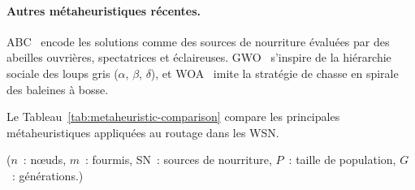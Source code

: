 \paragraph{Autres métaheuristiques récentes.}
ABC~\cite{karaboga2005abc} encode les solutions comme des sources de nourriture évaluées par des abeilles ouvrières, spectatrices et éclaireuses. GWO~\cite{mirjalili2014gwo} s'inspire de la hiérarchie sociale des loups gris ($\alpha$, $\beta$, $\delta$), et WOA~\cite{mirjalili2016woa} imite la stratégie de chasse en spirale des baleines à bosse.

Le Tableau~\ref{tab:metaheuristic-comparison} compare les principales métaheuristiques appliquées au routage dans les WSN.

\begin{table}[htbp]
\centering
\caption{Comparaison des approches métaheuristiques pour le routage dans les WSN.}
\label{tab:metaheuristic-comparison}
\end{table}

\noindent ($n$~: n\oe{}uds, $m$~: fourmis, SN~: sources de nourriture, $P$~: taille de population, $G$~: générations.)

